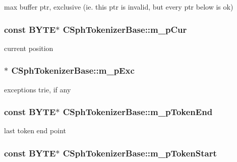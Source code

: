 max buffer ptr, exclusive (ie. this ptr is invalid, but every ptr below is ok) 

\hypertarget{classCSphTokenizerBase_a337768e9d353bbc32c4ff2c36815148e}{
\subsubsection[{m\-\_\-p\-Cur}]{\setlength{\rightskip}{0pt plus 5cm}const {\bf B\-Y\-T\-E}$\ast$ C\-Sph\-Tokenizer\-Base\-::m\-\_\-p\-Cur\hspace{0.3cm}{\ttfamily [protected]}}}\label{classCSphTokenizerBase_a337768e9d353bbc32c4ff2c36815148e}


current position 

\hypertarget{classCSphTokenizerBase_af89cb7eaf47a82eb139c43be0b19827f}{
\subsubsection[{m\-\_\-p\-Exc}]{$\ast$ C\-Sph\-Tokenizer\-Base\-::m\-\_\-p\-Exc\hspace{0.3cm}{\ttfamily [protected]}}}\label{classCSphTokenizerBase_af89cb7eaf47a82eb139c43be0b19827f}


exceptions trie, if any 

\hypertarget{classCSphTokenizerBase_acaa50a8da4cf61d6adb7b9e139c6fba3}{
\subsubsection[{m\-\_\-p\-Token\-End}]{\setlength{\rightskip}{0pt plus 5cm}const {\bf B\-Y\-T\-E}$\ast$ C\-Sph\-Tokenizer\-Base\-::m\-\_\-p\-Token\-End\hspace{0.3cm}{\ttfamily [protected]}}}\label{classCSphTokenizerBase_acaa50a8da4cf61d6adb7b9e139c6fba3}


last token end point 

\hypertarget{classCSphTokenizerBase_a990fc681be719877799ef7c7a884683c}{
\subsubsection[{m\-\_\-p\-Token\-Start}]{\setlength{\rightskip}{0pt plus 5cm}const {\bf B\-Y\-T\-E}$\ast$ C\-Sph\-Tokenizer\-Base\-::m\-\_\-p\-Token\-Start\hspace{0.3cm}{\ttfamily [protected]}}}\label{classCSphTokenizerBase_a990fc681be719877799ef7c7a884683c}


